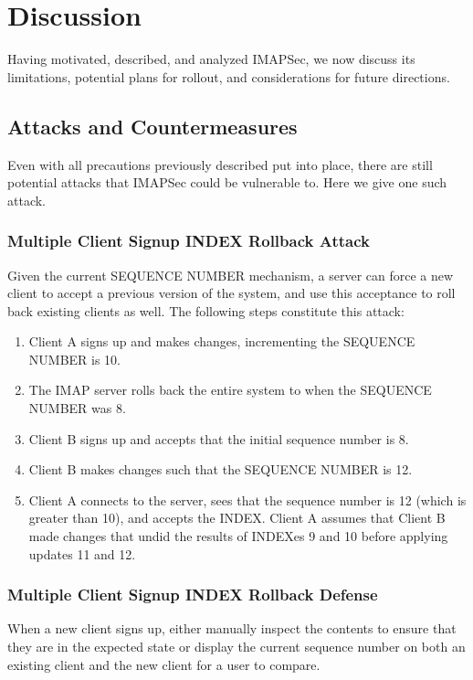 \documentclass[pageno]{jpaper}
\newcommand{\project}{IMAPSec }
\newcommand{\projectnospace}{IMAPSec}
\begin{document}
\section{Discussion}

Having motivated, described, and analyzed \projectnospace, we now discuss its limitations, potential plans for rollout, and considerations for future directions.

\subsection{Attacks and Countermeasures}

Even with all precautions previously described put into place, there are still potential attacks that \project could be vulnerable to. Here we give one such attack.

\subsubsection{Multiple Client Signup INDEX Rollback Attack}

Given the current SEQUENCE NUMBER mechanism, a server can force a new client to accept a previous version of the system, and use this acceptance to roll back existing clients as well. The following steps constitute this attack:

\begin{enumerate}
\item Client A signs up and makes changes, incrementing the SEQUENCE NUMBER is 10.
\item The IMAP server rolls back the entire system to when the SEQUENCE NUMBER was 8.
\item Client B signs up and accepts that the initial sequence number is 8.
\item Client B makes changes such that the SEQUENCE NUMBER is 12.
\item Client A connects to the server, sees that the sequence number is 12 (which is greater than 10), and accepts the INDEX. Client A assumes that Client B made changes that undid the results of INDEXes 9 and 10 before applying updates 11 and 12.
\end{enumerate}

\subsubsection{Multiple Client Signup INDEX Rollback Defense}
When a new client signs up, either manually inspect the contents to ensure that they are in the expected state or display the current sequence number on both an existing client and the new client for a user to compare.
\end{document}
